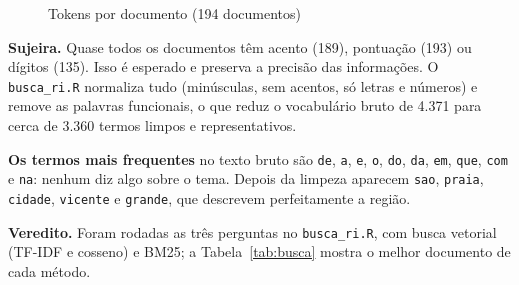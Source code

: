 \documentclass[
  article,
  12pt,
  oneside,
  a4paper,
  english,
  brazil
]{abntex2}
\begin{document}
\begin{figure}[htb]
  \centering
  \caption{Tokens por documento (194 documentos)}
  \label{fig:tam}
\end{figure}

\textbf{Sujeira.} Quase todos os documentos têm acento (189), pontuação (193)
ou dígitos (135). Isso é esperado e preserva a precisão das informações. O 
\texttt{busca\_ri.R} normaliza tudo (minúsculas, sem acentos, só letras e números)
e remove as palavras funcionais, o que reduz o vocabulário bruto de 4.371 para
cerca de 3.360 termos limpos e representativos.

\textbf{Os termos mais frequentes} no texto bruto são \texttt{de}, \texttt{a},
\texttt{e}, \texttt{o}, \texttt{do}, \texttt{da}, \texttt{em}, \texttt{que},
\texttt{com} e \texttt{na}: nenhum diz algo sobre o tema. Depois da limpeza
aparecem \texttt{sao}, \texttt{praia}, \texttt{cidade}, \texttt{vicente} e
\texttt{grande}, que descrevem perfeitamente a região.

\textbf{Veredito.} Foram rodadas as três perguntas no \texttt{busca\_ri.R}, com busca
vetorial (TF-IDF e cosseno) e BM25; a Tabela~\ref{tab:busca}
mostra o melhor documento de cada método.
\end{document}
